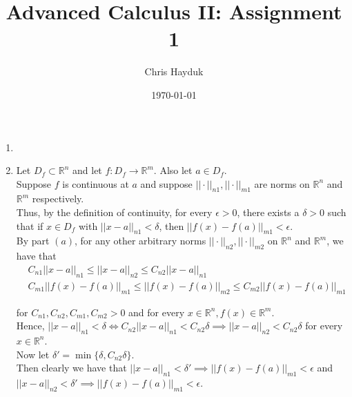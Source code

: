 \documentclass[12pt]{article}
\newenvironment{problem}[2][Problem]{\begin{trivlist}
\item[\hskip \labelsep {\bfseries #1}\hskip \labelsep {\bfseries #2.}]}{\end{trivlist}}
\begin{document}
\title{Advanced Calculus II: Assignment 1}

\author{Chris Hayduk}
\date{\today}

\maketitle

\begin{problem}{1}
\end{problem}

\begin{enumerate}[label=\alph*)]

\item 

\item Let $D_f \subset \mathbb{R}^n$ and let $f: D_f \to \mathbb{R}^m$. Also let $a \in D_f$.\\

Suppose $f$ is continuous at $a$ and suppose $|| \cdot ||_{n1}, || \cdot ||_{m1}$ are norms on $\mathbb{R}^n$ and $\mathbb{R}^m$ respectively.\\

Thus, by the definition of continuity, for every $\epsilon > 0$, there exists a $\delta > 0$ such that if $x \in D_f$ with $|| x - a ||_{n1} < \delta$, then $|| f(x) - f(a) ||_{m1} < \epsilon$.\\

By part $(a)$, for any other arbitrary norms $|| \cdot ||_{n2}, || \cdot ||_{m2}$ on $\mathbb{R}^n$ and $\mathbb{R}^m$, we have that
\begin{align*}
&C_{n1} || x - a ||_{n1} \leq || x - a ||_{n2} \leq C_{n2} || x - a ||_{n1}\\
&C_{m1} || f(x) - f(a) ||_{m1} \leq || f(x) - f(a) ||_{m2} \leq C_{m2} || f(x) - f(a) ||_{m1}
\end{align*}

for $C_{n1}, C_{n2}, C_{m1}, C_{m2} > 0$ and for every $x \in \mathbb{R}^n, f(x) \in \mathbb{R}^m$.\\

Hence, $|| x - a ||_{n1} < \delta \iff C_{n2} || x - a ||_{n1} < C_{n2} \delta \implies || x - a ||_{n2} < C_{n2} \delta$ for every $x \in \mathbb{R}^n$.\\

Now let $\delta' = \min\{\delta, C_{n2}\delta\}$.\\

Then clearly we have that $|| x - a ||_{n1} < \delta' \implies || f(x) - f(a) ||_{m1} < \epsilon$ and $ || x - a ||_{n2} < \delta' \implies || f(x) - f(a) ||_{m1} < \epsilon$.\\



\end{enumerate}
\end{document}
